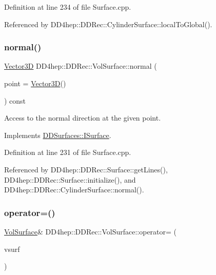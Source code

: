 Definition at line 234 of file Surface.\+cpp.



Referenced by D\+D4hep\+::\+D\+D\+Rec\+::\+Cylinder\+Surface\+::local\+To\+Global().

\hypertarget{class_d_d4hep_1_1_d_d_rec_1_1_vol_surface_a67e403083cb340e874d6cb777868354d}{}\label{class_d_d4hep_1_1_d_d_rec_1_1_vol_surface_a67e403083cb340e874d6cb777868354d} 
\subsubsection{\texorpdfstring{normal()}{normal()}}
{\footnotesize\ttfamily \hyperlink{class_d_d_surfaces_1_1_vector3_d}{Vector3D} D\+D4hep\+::\+D\+D\+Rec\+::\+Vol\+Surface\+::normal (\begin{DoxyParamCaption}\item[{const \hyperlink{class_d_d_surfaces_1_1_vector3_d}{Vector3D} \&}]{point = {\ttfamily \hyperlink{class_d_d_surfaces_1_1_vector3_d}{Vector3D}()} }\end{DoxyParamCaption}) const\hspace{0.3cm}{\ttfamily [virtual]}}



Access to the normal direction at the given point. 



Implements \hyperlink{class_d_d_surfaces_1_1_i_surface_abbead4b1af2864d6d3f61270543310a0}{D\+D\+Surfaces\+::\+I\+Surface}.



Definition at line 231 of file Surface.\+cpp.



Referenced by D\+D4hep\+::\+D\+D\+Rec\+::\+Surface\+::get\+Lines(), D\+D4hep\+::\+D\+D\+Rec\+::\+Surface\+::initialize(), and D\+D4hep\+::\+D\+D\+Rec\+::\+Cylinder\+Surface\+::normal().

\hypertarget{class_d_d4hep_1_1_d_d_rec_1_1_vol_surface_a3572914428d729854bc7c55466ddb788}{}\label{class_d_d4hep_1_1_d_d_rec_1_1_vol_surface_a3572914428d729854bc7c55466ddb788} 
\subsubsection{\texorpdfstring{operator=()}{operator=()}}
{\footnotesize\ttfamily \hyperlink{class_d_d4hep_1_1_d_d_rec_1_1_vol_surface}{Vol\+Surface}\& D\+D4hep\+::\+D\+D\+Rec\+::\+Vol\+Surface\+::operator= (\begin{DoxyParamCaption}\item[{const \hyperlink{class_d_d4hep_1_1_d_d_rec_1_1_vol_surface}{Vol\+Surface} \&}]{vsurf }\end{DoxyParamCaption})\hspace{0.3cm}{\ttfamily [inline]}}



